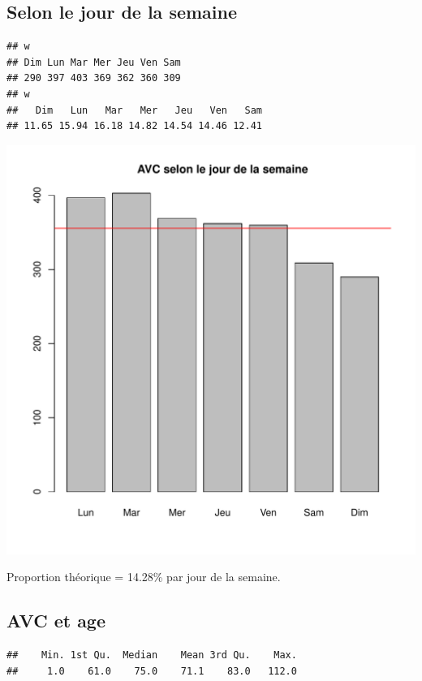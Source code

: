 \documentclass[12pt,english,french,twoside]{report}\usepackage[]{graphicx}\usepackage[]{color}
\makeatletter
\def\maxwidth{ %
  \ifdim\Gin@nat@width>\linewidth
    \linewidth
  \else
    \Gin@nat@width
  \fi
}
\newenvironment{kframe}{%
 \def\at@end@of@kframe{}%
 \ifinner\ifhmode%
  \def\at@end@of@kframe{\end{minipage}}%
  \begin{minipage}{\columnwidth}%
 \fi\fi%
 \def\FrameCommand##1{\hskip\@totalleftmargin \hskip-\fboxsep
 \colorbox{shadecolor}{##1}\hskip-\fboxsep
     \hskip-\linewidth \hskip-\@totalleftmargin \hskip\columnwidth}%
 \MakeFramed {\advance\hsize-\width
   \@totalleftmargin\z@ \linewidth\hsize
   \@setminipage}}%
 {\par\unskip\endMakeFramed%
 \at@end@of@kframe}
\newenvironment{knitrout}{}{} %
\makeatother
\begin{document}
\subsection*{Selon le jour de la semaine}

\begin{knitrout}
\color{fgcolor}\begin{kframe}
\begin{verbatim}
## w
## Dim Lun Mar Mer Jeu Ven Sam 
## 290 397 403 369 362 360 309
## w
##   Dim   Lun   Mar   Mer   Jeu   Ven   Sam 
## 11.65 15.94 16.18 14.82 14.54 14.46 12.41
\end{verbatim}
\end{kframe}
\includegraphics[width=\maxwidth]{figure/avc_jour_semaine} 

\end{knitrout}

Proportion théorique = 14.28\% par jour de la semaine.

\subsection*{AVC et age}
\begin{knitrout}
\color{fgcolor}\begin{kframe}
\begin{verbatim}
##    Min. 1st Qu.  Median    Mean 3rd Qu.    Max. 
##     1.0    61.0    75.0    71.1    83.0   112.0
\end{verbatim}
\end{kframe}
\end{knitrout}
\end{document}
